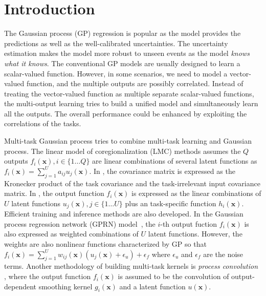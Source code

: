 \section{Introduction}

The Gaussian process (GP) regression is popular as the model provides the predictions as well as the well-calibrated uncertainties. The uncertainty estimation makes the model more robust to unseen events as the model \emph{knows what it knows}. The conventional GP models are usually designed to learn a scalar-valued function. However, in some scenarios, we need to model a vector-valued function, and the multiple outputs are possibly correlated. Instead of treating the vector-valued function as multiple separate scalar-valued functions, the multi-output learning \cite{zhang2017survey} tries to build a unified model and simultaneously learn all the outputs. The overall performance could be enhanced by exploiting the correlations of the tasks.

Multi-task Gaussian process \cite{vectorvaluedkernel} tries to combine multi-task learning and Gaussian process. The linear model of coregionalization (LMC) methods \cite{journel1978mining} assumes the $Q$ outputs $f_i(\bm{x}), i \in \{1\dots Q\}$ are linear combinations of several latent functions as $f_i(\bm{x}) = \sum_{j=1}^U a_{ij} u_j(\bm{x})$. In \cite{bonilla2008multi}, the covariance matrix is expressed as the Kronecker product of the task covariance and the task-irrelevant input covariance matrix. In \cite{nguyen2014collaborative}, the output function $f_i(\bm{x})$ is expressed as the linear combinations of $U$ latent functions $u_j(\bm{x}), j \in \{1\dots U\}$ plus an task-specific function $h_i(\bm{x})$. Efficient training and inference methods are also developed. In the Gaussian process regression network (GPRN) model~\cite{wilson2012gaussian}, the $i$-th output fuction $f_i(\bm{x})$ is also expressed as weighted combinations of $U$ latent functions. However, the weights are also nonlinear functions characterized by GP so that $f_i(\bm{x}) = \sum_{j=1}^U w_{ij}(\bm{x}) (u_j(\bm{x}) + \epsilon_u) + \epsilon_f$ where $\epsilon_u$ and $\epsilon_f$ are the noise terms. Another methodology of building multi-task kernels is \emph{process convolution} \cite{boyle2005dependent,alvarez2009sparse,alvarez2011computationally}, where the output function $f_i(\bm{x})$ is assumed to be the convolution of output-dependent smoothing kernel $g_i(\bm{x})$ and a latent function $u(\bm{x})$.

